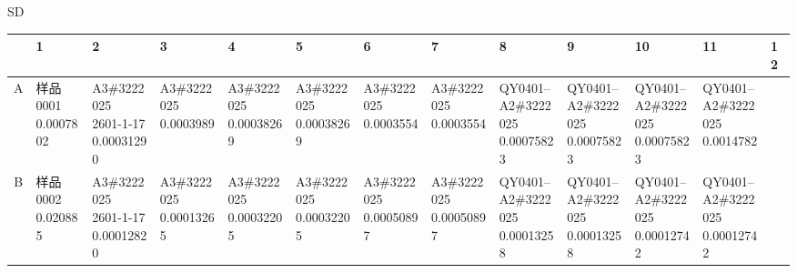 \documentclass[UTF8,10pt,a4paper,fontset=fandol]{ctexart}
\begin{document}
\vspace{0.7em}
\noindent SD

\begin{center}
\scriptsize
\begin{tabular}{c|*{12}{p{0.55cm}|}}
 & 1 & 2 & 3 & 4 & 5 & 6 & 7 & 8 & 9 & 10 & 11 & 12\\ \hline
A &
\shortstack{样品0001\\0.0007802} &
\shortstack{A3\#3222025\\2601-1-17\\0.00031290} &
\shortstack{A3\#3222025\\0.0003989} &
\shortstack{A3\#3222025\\0.00038269} &
\shortstack{A3\#3222025\\0.00038269} &
\shortstack{A3\#3222025\\0.0003554} &
\shortstack{A3\#3222025\\0.0003554} &
\shortstack{QY0401--\\A2\#3222025\\0.00075823} &
\shortstack{QY0401--\\A2\#3222025\\0.00075823} &
\shortstack{QY0401--\\A2\#3222025\\0.00075823} &
\shortstack{QY0401--\\A2\#3222025\\0.0014782} &
\\ \hline
B &
\shortstack{样品0002\\0.020885} &
\shortstack{A3\#3222025\\2601-1-17\\0.00012820} &
\shortstack{A3\#3222025\\0.00013265} &
\shortstack{A3\#3222025\\0.00032205} &
\shortstack{A3\#3222025\\0.00032205} &
\shortstack{A3\#3222025\\0.00050897} &
\shortstack{A3\#3222025\\0.00050897} &
\shortstack{QY0401--\\A2\#3222025\\0.00013258} &
\shortstack{QY0401--\\A2\#3222025\\0.00013258} &
\shortstack{QY0401--\\A2\#3222025\\0.00012742} &
\shortstack{QY0401--\\A2\#3222025\\0.00012742} &

\end{tabular}
\end{center}
\end{document}
